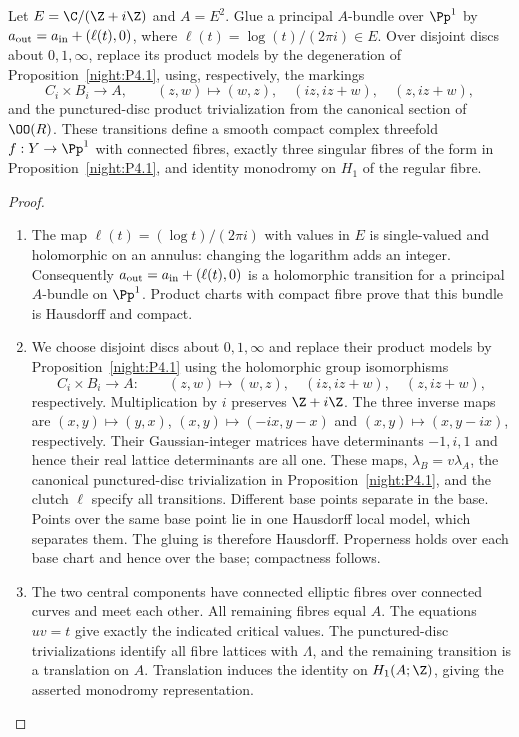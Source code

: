 \begin{proposition}\hypertarget{tag-02WR}{}\label{night:P4.2}\label{stmt:P4.2}

Let $E=\C/(\Z+i\Z)$ and $A=E^2$. Glue a principal $A$-bundle
over $\Pp^1$ by
$a_{\rm out}=a_{\rm in}+(\ell(t),0)$, where
$\ell(t)=\log(t)/(2\pi i)\in E$. Over disjoint discs about
$0,1,\infty$, replace its product models by the degeneration of
Proposition~\ref{night:P4.1}, using, respectively, the markings
\[
 C_i\times B_i\longrightarrow A,\qquad
 (z,w)\longmapsto(w,z),\quad(iz,iz+w),\quad(z,iz+w),
\]
and the punctured-disc product trivialization from the canonical section
of $\OO(R)$. These transitions define a smooth compact complex
threefold $f:Y\to\Pp^1$ with connected fibres, exactly three singular
fibres of the form in Proposition~\ref{night:P4.1}, and identity
monodromy on $H_1$ of the regular fibre.
\end{proposition}
\begin{proof}

\begin{enumerate}[label={$\langle1\rangle$\arabic*.},leftmargin=*]
\item The map $\ell(t)=(\log t)/(2\pi i)$ with values in $E$ is single-valued and
holomorphic on an annulus: changing the logarithm adds an integer.
Consequently $a_{\rm out}=a_{\rm in}+(\ell(t),0)$ is a holomorphic transition
for a principal $A$-bundle on $\Pp^1$. Product charts with compact fibre
prove that this bundle is Hausdorff and compact.

\item We choose disjoint discs about $0,1,\infty$ and replace their product models
by Proposition~\ref{night:P4.1} using the holomorphic group isomorphisms
\[
 C_i\times B_i\longrightarrow A:\qquad
 (z,w)\mapsto(w,z),\quad(iz,iz+w),\quad(z,iz+w),
\]
respectively. Multiplication by $i$ preserves $\Z+i\Z$. The three inverse maps
are $(x,y)\mapsto(y,x)$, $(x,y)\mapsto(-ix,y-x)$ and
$(x,y)\mapsto(x,y-ix)$, respectively. Their Gaussian-integer matrices
have determinants $-1,i,1$ and hence their real lattice determinants
are all one. These maps, $\lambda_B=v\lambda_A$, the canonical
punctured-disc trivialization in Proposition~\ref{night:P4.1}, and
the clutch $\ell$ specify all transitions.
Different base points separate in the base. Points over the same base
point lie in one Hausdorff local model, which separates them. The gluing is
therefore Hausdorff. Properness holds over each base chart and hence over
the base; compactness follows.

\item The two central components have connected elliptic fibres over connected
curves and meet each other. All remaining fibres equal $A$. The equations
$uv=t$ give exactly the indicated critical values. The punctured-disc
trivializations identify all fibre lattices with $\Lambda$, and the remaining
transition is a translation on $A$. Translation induces the identity on
$H_1(A;\Z)$, giving the asserted monodromy representation.

\end{enumerate}
\end{proof}